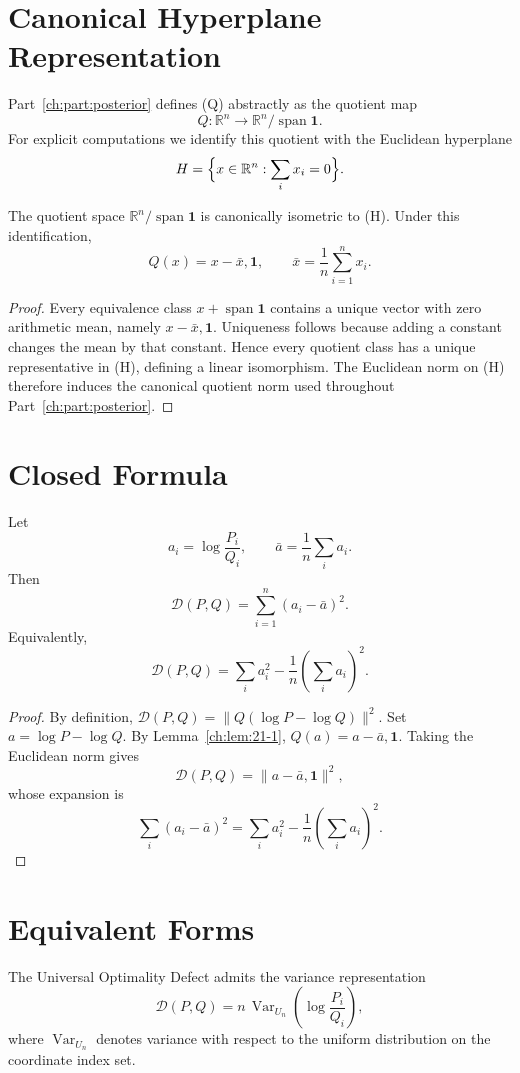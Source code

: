 \section{Canonical Hyperplane Representation}\label{ch:sec:canonical-hyperplane-representation}
Part~\ref{ch:part:posterior} defines (Q) abstractly as the quotient map
\[ Q:\mathbb{R}^{n}\rightarrow
\mathbb{R}^{n}/\operatorname{span}{\mathbf1}. \]
For explicit computations we identify this quotient with the Euclidean
hyperplane
\[ H=\Bigl\{x\in\mathbb{R}^{n}:\sum_{i}
x_i=0\Bigr\}. \]
\begin{lemma}
\label{ch:lem:21-1}
The quotient space
\(\mathbb{R}^{n}/\operatorname{span}{\mathbf1}\) is
canonically isometric to (H). Under this identification,
\[ Q(x)=x-\bar x,\mathbf1, \qquad
\bar x=\frac1n\sum_{i=1}^{n} x_i. \]
\begin{proof}
Every equivalence class
\(x+\operatorname{span}{\mathbf1}\) contains a unique
vector with zero arithmetic mean, namely
\(x-\bar x,\mathbf1\). Uniqueness follows because adding a
constant changes the mean by that constant. Hence every quotient class
has a unique representative in (H), defining a linear isomorphism. The
Euclidean norm on (H) therefore induces the canonical quotient norm used
throughout Part~\ref{ch:part:posterior}.
\end{proof}
\end{lemma}
\section{Closed Formula}\label{ch:sec:closed-formula}
\begin{theorem}
\label{ch:thm:21-2}
Let
\[ a_i=\log\frac{P_i}{Q_i}, \qquad
\bar a=\frac1n\sum_{i} a_i. \]
Then
\[ \boxed{
\mathcal{D}(P,Q)
=
\sum_{i=1}^{n}(a_i-\bar a)^2.
} \]
Equivalently,
\[ \boxed{
\mathcal{D}(P,Q)
=
\sum_i a_i^2
-
\frac1n\left(\sum_i a_i\right)^2.
} \]
\begin{proof}
By definition,
$\mathcal{D}(P,Q) = \|Q(\log P-\log Q)\|^{2}.$
Set \(a=\log P-\log Q\). By Lemma~\ref{ch:lem:21-1},
$Q(a)=a-\bar a,\mathbf1.$
Taking the Euclidean norm gives
\[ \mathcal{D}(P,Q) = \|a-\bar a,\mathbf1\|^{2},
\]
whose expansion is
\[ \sum_{i}(a_i-\bar a)^{2} = \sum_{i}
a_i^{2}-\frac1n\left(\sum_{i}
a_i\right)^{2}. \]
\end{proof}
\end{theorem}
\section{Equivalent Forms}\label{ch:sec:equivalent-forms}
\begin{corollary}
\label{ch:cor:21-3}
The Universal Optimality Defect admits the variance representation
\[ \boxed{
\mathcal{D}(P,Q)
=
n\,
\operatorname{Var}_{U_n}
\!\left(
\log\frac{P_i}{Q_i}
\right),
} \]
where \(\operatorname{Var}_{U_n}\) denotes variance with respect
to the uniform distribution on the coordinate index set.
\end{corollary}
